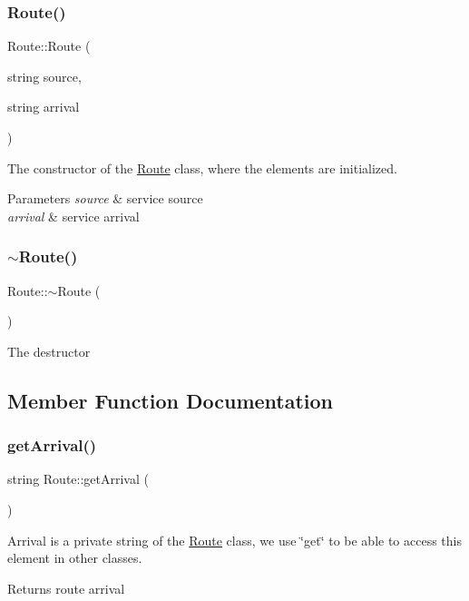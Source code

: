 \subsubsection{\texorpdfstring{Route()}{Route()}\hspace{0.1cm}{\footnotesize\ttfamily [2/2]}}
{\footnotesize\ttfamily Route\+::\+Route (\begin{DoxyParamCaption}\item[{string}]{source,  }\item[{string}]{arrival }\end{DoxyParamCaption})}

The constructor of the \hyperlink{classRoute}{Route} class, where the elements are initialized. 
\begin{DoxyParams}{Parameters}
{\em source} & service source \\
\hline
{\em arrival} & service arrival \\
\hline
\end{DoxyParams}
\hypertarget{classRoute_a41212532f2bce3298d8f9468f82c62ab}{}\label{classRoute_a41212532f2bce3298d8f9468f82c62ab} 
\subsubsection{\texorpdfstring{$\sim$\+Route()}{~Route()}}
{\footnotesize\ttfamily Route\+::$\sim$\+Route (\begin{DoxyParamCaption}{ }\end{DoxyParamCaption})}

The destructor 

\subsection{Member Function Documentation}
\hypertarget{classRoute_aaa88da20cc0c2f362f332288be26cd2c}{}\label{classRoute_aaa88da20cc0c2f362f332288be26cd2c} 
\subsubsection{\texorpdfstring{get\+Arrival()}{getArrival()}}
{\footnotesize\ttfamily string Route\+::get\+Arrival (\begin{DoxyParamCaption}{ }\end{DoxyParamCaption})}

Arrival is a private string of the \hyperlink{classRoute}{Route} class, we use \char`\"{}get\char`\"{} to be able to access this element in other classes. \begin{DoxyReturn}{Returns}
route arrival 
\end{DoxyReturn}
\hypertarget{classRoute_a4ccb609408c7d1e7020017b2de6e2f31}{}\label{classRoute_a4ccb609408c7d1e7020017b2de6e2f31} 
